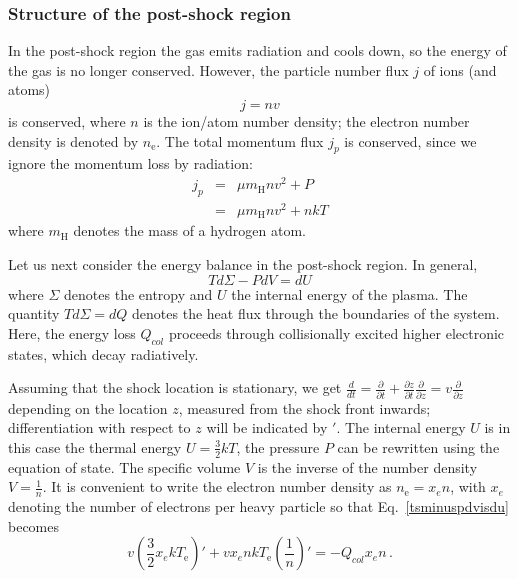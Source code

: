 \subsubsection{Structure of the post-shock region}

In the post-shock region the gas emits radiation and cools down, so the energy of the gas is no longer conserved.  However, the particle number flux $j$ of ions (and atoms)
\begin{equation}j=nv\label{j_n}\end{equation}
is conserved, where $n$ is the ion/atom number density; the electron number density is denoted by $n_{\mathrm{e}}$. The total momentum flux $j_p$ is conserved, since we ignore the momentum loss by radiation:
\begin{eqnarray}
j_p&=&\mu m_{\mathrm{H}} n v^2+P \nonumber \\
   &=&\mu m_{\mathrm{H}} n v^2+nkT \label{j_p}
\end{eqnarray}
where $m_{\mathrm{H}}$ denotes the mass of a hydrogen atom.

Let us next consider the energy balance in the post-shock region. In general,
\begin{equation} \label{tsminuspdvisdu} T d\Sigma -P dV=dU \end{equation}
where $\Sigma$ denotes the entropy and $U$ the internal energy of the plasma. The quantity $T d\Sigma=dQ$ denotes the heat flux through the boundaries of the system. Here, the energy loss $Q_{col}$ proceeds through collisionally excited higher electronic states, which decay radiatively.

Assuming that the shock location is stationary, we get $\frac{d}{dt}=\frac{\partial}{\partial t}+\frac{\partial z}{\partial t}\frac{\partial}{\partial z}=v\frac{\partial}{\partial z}$ depending on the location $z$, measured from the shock front inwards; differentiation with respect to $z$ will be indicated by $'$.
The internal energy $U$ is in this case the thermal energy $U=\frac{3}{2}kT$, the pressure $P$ can be rewritten using the equation of state. The specific volume $V$ is the inverse of the number density $V=\frac{1}{n}$.
It is convenient to write the electron number density as \mbox{$n_{\mathrm{e}}=x_e n$,} with $x_e$ denoting the number of electrons per heavy particle so that Eq.~\ref{tsminuspdvisdu} becomes
\begin{equation}
\label{energyelec}
v\left(\frac{3}{2}x_e k T_{\mathrm{e}}\right)'+v x_e n k T_{\mathrm{e}} \left(\frac{1}{n}\right)'=-Q_{col} x_e n\,.
\end{equation}

